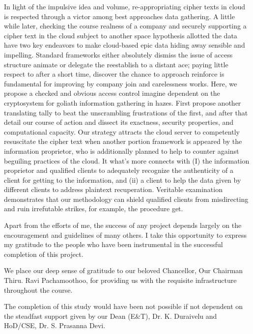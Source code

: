 \documentclass[BTech]{srmuthesis}
\begin{document}
\abstract
\begin{doublespacing}
{\large\noindent In light of the impulsive idea and volume, re-appropriating cipher texts in cloud is respected through a victor among best approaches data gathering.  A little while later, checking the course realness of a company and securely supporting a cipher text in the cloud subject to another space hypothesis allotted the data have two key endeavors to make cloud-based epic data hiding away sensible and impelling. Standard frameworks   either absolutely dismiss the issue of access structure animate or delegate the reestablish to a distant ace; paying little respect to after a short time, discover the chance to approach reinforce is fundamental for improving by company join and carelessness works. Here, we propose a checked and obvious access control imagine dependent on the cryptosystem for goliath information gathering in hazes. First propose another translating tally to beat the unscrambling frustrations of the first, and after that detail our course of action and dissect its exactness, security properties, and computational capacity. Our strategy attracts the cloud server to competently resuscitate the cipher text when another portion framework is appeared by the information proprietor, who is additionally planned to help to counter against beguiling practices of the cloud. It what's more connects with (I) the information proprietor and qualified clients to adequately recognize the authenticity of a client for getting to the information, and (ii) a client to help the data given by different clients to address plaintext recuperation. Veritable examination demonstrates that our methodology can shield qualified clients from misdirecting and ruin irrefutable strikes, for example, the procedure get.}
\end{doublespacing}

\pagebreak
\acknowledgements
Apart from the efforts of me, the success of any project depends largely on the encouragement and guidelines of many others. I take this opportunity to express my gratitude to the people who have been instrumental in the successful completion of this project. 

We place our deep sense of gratitude to our beloved {Chancellor, Our Chairman Thiru. Ravi Pachamoothoo}, for providing us with the requisite infrastructure throughout the course.

The completion of this study would have been not possible if not dependent on the steadfast support given by our {Dean (E\&T),  Dr. K. Duraivelu} and HoD/CSE, Dr. S. Prasanna Devi.
\end{document}
